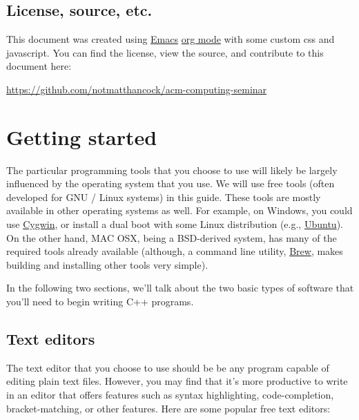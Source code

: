 \documentclass[11pt]{article}
\begin{document}
\subsection{License, source, etc.}
\label{sec:orgheadline3}
This document was created using \href{https://www.gnu.org/software/emacs/}{Emacs} \href{http://orgmode.org/}{org mode} with some custom css and 
javascript. You can find the license, view the source, and contribute 
to this document here:

\href{https://github.com/notmatthancock/acm-computing-seminar}{\url{https://github.com/notmatthancock/acm-computing-seminar}}

\section{Getting started}
\label{sec:orgheadline8}
The particular programming tools that you choose to use will
likely be largely influenced by the operating system that you use.
We will use free tools (often developed for GNU / Linux systems) in
this guide. These tools are mostly available in other operating 
systems as well. For example, on Windows, you could use \href{https://www.cygwin.com/}{Cygwin}, or 
install a dual boot with some Linux distribution (e.g., \href{http://www.ubuntu.com/}{Ubuntu}). On the 
other hand, MAC OSX, being a BSD-derived system, has many of the 
required tools already available (although, a command line utility, 
\href{http://brew.sh}{Brew}, makes building and installing other tools very simple).

In the following two sections, we'll talk about the two basic types of 
software that you'll need to begin writing C++ programs.

\subsection{Text editors}
\label{sec:orgheadline5}

The text editor that you choose to use should be be any program 
capable of editing plain text files. However, you may find that it's 
more productive to write in an editor that offers features such as 
syntax highlighting, code-completion, bracket-matching, or other features. 
Here are some popular free text editors:
\end{document}
